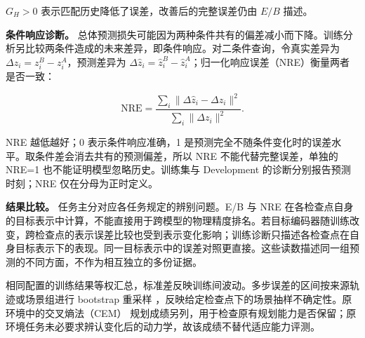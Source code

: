 \documentclass[10pt,twocolumn,letterpaper]{article}
\begin{document}
$G_H>0$ 表示匹配历史降低了误差，改善后的完整误差仍由 $E/B$ 描述。

\textbf{条件响应诊断。} 总体预测损失可能因为两种条件共有的偏差减小而下降。训练分析另比较两条件造成的未来差异，即条件响应。对二条件查询，令真实差异为 $\Delta z_i=z_i^B-z_i^A$，预测差异为 $\Delta\hat z_i=\hat z_i^B-\hat z_i^A$；归一化响应误差（NRE）衡量两者是否一致：

\begin{equation}
\mathrm{NRE}=\frac{\sum_i\|\Delta\hat z_i-\Delta z_i\|^2}
{\sum_i\|\Delta z_i\|^2}.
\label{eq:response-error}
\end{equation}

NRE 越低越好；0 表示条件响应准确，1 是预测完全不随条件变化时的误差水平。取条件差会消去共有的预测偏差，所以 NRE 不能代替完整误差，单独的 NRE=1 也不能证明模型忽略历史。训练集与 Development 的诊断分别报告预测时刻；NRE 仅在分母为正时定义。

\textbf{结果比较。} 任务主分对应各任务规定的辨别问题。E/B 与 NRE 在各检查点自身的目标表示中计算，不能直接用于跨模型的物理精度排名。若目标编码器随训练改变，跨检查点的表示误差比较也受到表示变化影响；训练诊断只描述各检查点在自身目标表示下的表现。同一目标表示中的误差对照更直接。这些读数描述同一组预测的不同方面，不作为相互独立的多份证据。

相同配置的训练结果等权汇总，标准差反映训练间波动。多步误差的区间按来源轨迹或场景组进行 bootstrap 重采样 \cite{efron1993bootstrap}，反映给定检查点下的场景抽样不确定性。原环境中的交叉熵法（CEM）\cite{deboer2005cem} 规划成绩另列，用于检查原有规划能力是否保留；原环境任务未必要求辨认变化后的动力学，故该成绩不替代适应能力评测。
{\small


}
\end{document}
